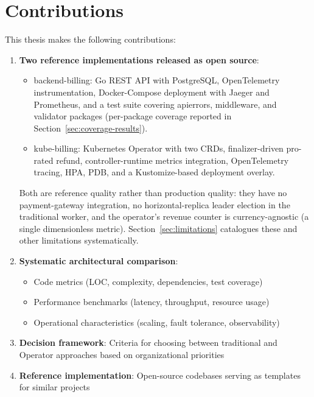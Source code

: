 \section{Contributions}

This thesis makes the following contributions:

\begin{enumerate}
    \item \textbf{Two reference implementations released as open source}:
    \begin{itemize}
        \item backend-billing: Go REST API with PostgreSQL, OpenTelemetry instrumentation, Docker-Compose deployment with Jaeger and Prometheus, and a test suite covering apierrors, middleware, and validator packages (per-package coverage reported in Section~\ref{sec:coverage-results}).
        \item kube-billing: Kubernetes Operator with two CRDs, finalizer-driven pro-rated refund, controller-runtime metrics integration, OpenTelemetry tracing, HPA, PDB, and a Kustomize-based deployment overlay.
    \end{itemize}
    Both are reference quality rather than production quality: they have no payment-gateway integration, no horizontal-replica leader election in the traditional worker, and the operator's revenue counter is currency-agnostic (a single dimensionless metric). Section~\ref{sec:limitations} catalogues these and other limitations systematically.
    
    \item \textbf{Systematic architectural comparison}:
    \begin{itemize}
        \item Code metrics (LOC, complexity, dependencies, test coverage)
        \item Performance benchmarks (latency, throughput, resource usage)
        \item Operational characteristics (scaling, fault tolerance, observability)
    \end{itemize}
    
    \item \textbf{Decision framework}: Criteria for choosing between traditional and Operator approaches based on organizational priorities
    
    \item \textbf{Reference implementation}: Open-source codebases serving as templates for similar projects
\end{enumerate}

